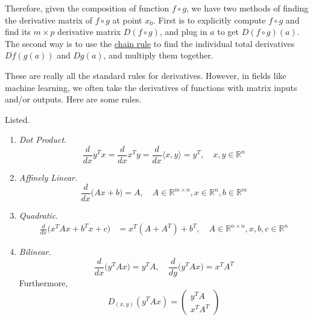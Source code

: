   Therefore, given the composition of function $f \circ g$, we have two methods of finding the derivative matrix of $f \circ g$ at point $x_0$. First is to explicitly compute $f \circ g$ and find its $m \times p$ derivative matrix $D (f \circ g)$, and plug in $a$ to get $D(f\circ g)(a)$. The second way is to use the \hyperref[thm:chain-rule]{chain rule} to find the individual total derivatives $D f(g(a))$ and $D g(a)$, and multiply them together. 

	These are really all the standard rules for derivatives. However, in fields like machine learning, we often take the derivatives of functions with matrix inputs and/or outputs. Here are some rules. 

	\begin{example}
		Listed. 
		\begin{enumerate}
			\item \textit{Dot Product}. 
				\begin{equation}
					\frac{d}{dx} y^T x = \frac{d}{dx} x^T y = \frac{d}{dx} \langle x, y \rangle = y^T, \quad x, y \in \mathbb{R}^n
				\end{equation}

		  \item \textit{Affinely Linear}. 
				\begin{equation}
					\frac{d}{dx} \big( Ax + b \big) = A, \quad A \in \mathbb{R}^{m \times n}, x \in \mathbb{R}^n, b \in \mathbb{R}^m
				\end{equation}

			\item \textit{Quadratic}. 
				\begin{align}
					\frac{d}{dx} \big( x^T A x + b^T x + c) & = x^T (A + A^T) + b^T, \quad A \in \mathbb{R}^{n \times n}, x, b, c \in \mathbb{R}^n 
				\end{align}

			\item \textit{Bilinear}. 
				\begin{equation}
					\frac{d}{dx} \big(y^T A x \big) = y^T A, \quad \frac{d}{dy} \big( y^T A x \big) = x^T A^T  
				\end{equation}
				Furthermore, 
				\begin{equation}
					D_{(x, y)} (y^T A x) = \begin{pmatrix} y^T A \\ x^T A^T \end{pmatrix} 
				\end{equation}
		\end{enumerate}
	\end{example}

